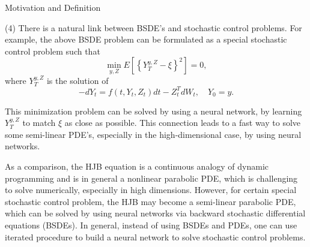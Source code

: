 \documentclass{beamer}
\begin{document}
\begin{frame}{Motivation and Definition}

    {\footnotesize \footnotesize
(4) There is a natural link between BSDE's and stochastic control problems. 
For example, the above BSDE problem can be formulated as a special 
stochastic control problem such that
\[
\min_{y,Z} E \left[ \left\{ Y_T^{y,Z} - \xi \right\}^2 \right] = 0,
\]
where \( Y_T^{y,Z} \) is the solution of
\[
-dY_t = f(t, Y_t, Z_t)dt - Z_t^T dW_t, \quad Y_0 = y.
\]

This minimization problem can be solved by using a neural network, 
by learning \( Y_T^{y,Z} \) to match \( \xi \) as close as possible. 
This connection leads to a fast way to 
solve some semi-linear PDE's, especially in the high-dimensional case, by using neural networks.
\vspace{1em}
\par As a comparison, the HJB equation is a continuous analogy of dynamic programming and 
is in general a nonlinear parabolic PDE, which is challenging to solve numerically, 
especially in high dimensions. However, for certain special stochastic control problem, 
the HJB may become a semi-linear parabolic PDE, which 
can be solved by using neural networks via backward stochastic differential equations (BSDEs).
In general, instead of using BSDEs and PDEs, 
one can use iterated procedure to build a neural network to
 solve stochastic control problems.
    }
    
\end{frame}
\end{document}
